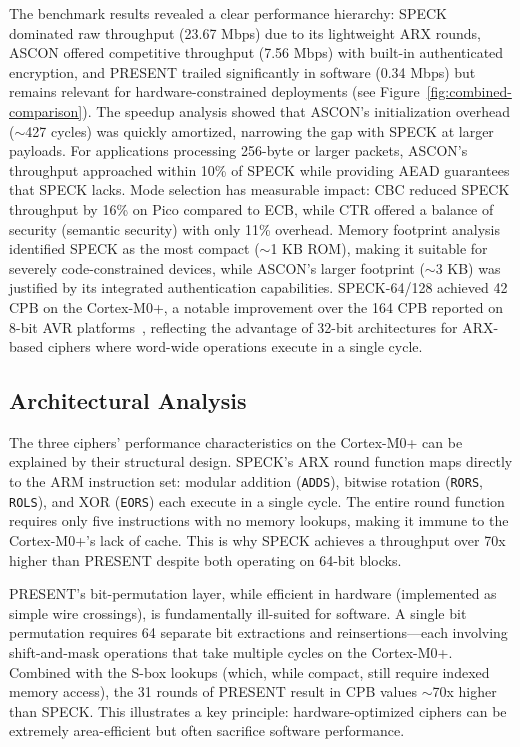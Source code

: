 \documentclass[12pt]{report}
\begin{document}
The benchmark results revealed a clear performance hierarchy: SPECK dominated raw throughput
(23.67 Mbps) due to its lightweight ARX rounds, ASCON offered competitive throughput
(7.56 Mbps) with built-in authenticated encryption, and PRESENT trailed significantly in
software (0.34 Mbps) but remains relevant for hardware-constrained deployments (see Figure~\ref{fig:combined-comparison}). The
speedup analysis showed that ASCON's initialization overhead ($\sim$427 cycles) was quickly
amortized, narrowing the gap with SPECK at larger payloads. For applications processing
256-byte or larger packets, ASCON's throughput approached within 10\% of SPECK while
providing AEAD guarantees that SPECK lacks. Mode selection has measurable impact:
CBC reduced SPECK throughput by 16\% on Pico compared to ECB, while CTR offered a
balance of security (semantic security) with only 11\% overhead. Memory footprint
analysis identified SPECK as the most compact ($\sim$1 KB ROM), making it suitable for
severely code-constrained devices, while ASCON's larger footprint ($\sim$3 KB) was
justified by its integrated authentication capabilities. SPECK-64/128 achieved
42 CPB on the Cortex-M0+, a notable improvement over the 164 CPB reported on
8-bit AVR platforms~\cite{beaulieu2015simon}, reflecting the advantage of
32-bit architectures for ARX-based ciphers where word-wide operations execute
in a single cycle.

\subsection*{Architectural Analysis}

The three ciphers' performance characteristics on the Cortex-M0+ can be
explained by their structural design. SPECK's ARX round function maps
directly to the ARM instruction set: modular addition (\texttt{ADDS}),
bitwise rotation (\texttt{RORS}, \texttt{ROLS}), and XOR (\texttt{EORS})
each execute in a single cycle. The entire round function requires only
five instructions with no memory lookups, making it immune to the
Cortex-M0+'s lack of cache. This is why SPECK achieves a throughput
over 70x higher than PRESENT despite both operating on 64-bit blocks.

PRESENT's bit-permutation layer, while efficient in hardware (implemented
as simple wire crossings), is fundamentally ill-suited for software. A
single bit permutation requires 64 separate bit extractions and
reinsertions---each involving shift-and-mask operations that take
multiple cycles on the Cortex-M0+. Combined with the S-box lookups
(which, while compact, still require indexed memory access), the
31 rounds of PRESENT result in CPB values $\sim$70x higher than SPECK.
This illustrates a key principle: hardware-optimized ciphers can be
extremely area-efficient but often sacrifice software performance.
\end{document}
